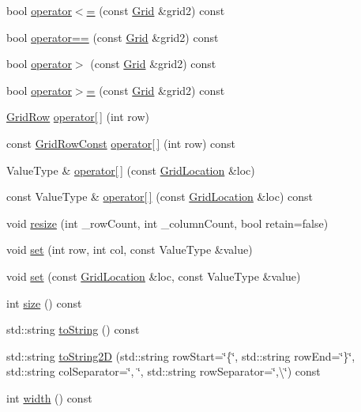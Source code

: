 \begin{DoxyCompactItemize}
$$bool \mbox{\hyperlink{classGrid_adc972513ba66ac1e3e5847abe6e8666c}{operator$<$=}} (const \mbox{\hyperlink{classGrid}{Grid}} \&grid2) const
\item 
bool \mbox{\hyperlink{classGrid_ae321d29c4eab96f54c2f86929a345e2b}{operator==}} (const \mbox{\hyperlink{classGrid}{Grid}} \&grid2) const
\item 
bool \mbox{\hyperlink{classGrid_aa2d6af2768a176d9ba044cf34087d766}{operator$>$}} (const \mbox{\hyperlink{classGrid}{Grid}} \&grid2) const
\item 
bool \mbox{\hyperlink{classGrid_a21431c500035c200656a8d67e96531c7}{operator$>$=}} (const \mbox{\hyperlink{classGrid}{Grid}} \&grid2) const
\item 
\mbox{\hyperlink{classGrid_1_1GridRow}{Grid\+Row}} \mbox{\hyperlink{classGrid_aa62a62fb923c387dbec19d9559fea429}{operator\mbox{[}$\,$\mbox{]}}} (int row)
\item 
const \mbox{\hyperlink{classGrid_1_1GridRowConst}{Grid\+Row\+Const}} \mbox{\hyperlink{classGrid_a8b881f7fb1e524d4cf2766bde140eeb1}{operator\mbox{[}$\,$\mbox{]}}} (int row) const
\item 
Value\+Type \& \mbox{\hyperlink{classGrid_afcc1243cd81603e13b8f223f0ceabe96}{operator\mbox{[}$\,$\mbox{]}}} (const \mbox{\hyperlink{structGridLocation}{Grid\+Location}} \&loc)
\item 
const Value\+Type \& \mbox{\hyperlink{classGrid_a914315640e381831ab30403063205359}{operator\mbox{[}$\,$\mbox{]}}} (const \mbox{\hyperlink{structGridLocation}{Grid\+Location}} \&loc) const
\item 
void \mbox{\hyperlink{classGrid_aa8036710a8d91046066eacbb8548b6fc}{resize}} (int \+\_\+row\+Count, int \+\_\+column\+Count, bool retain=false)
\item 
void \mbox{\hyperlink{classGrid_a6f5cee26d171f36d280a15c51332efc2}{set}} (int row, int col, const Value\+Type \&value)
\item 
void \mbox{\hyperlink{classGrid_a02a61287a9aee6a1ff7e8a8325ce094d}{set}} (const \mbox{\hyperlink{structGridLocation}{Grid\+Location}} \&loc, const Value\+Type \&value)
\item 
int \mbox{\hyperlink{classGrid_af9593d4a5ff4274efaf429cb4f9e57cc}{size}} () const
\item 
std\+::string \mbox{\hyperlink{classGrid_a1fe5121d6528fdea3f243321b3fa3a49}{to\+String}} () const
\item 
std\+::string \mbox{\hyperlink{classGrid_a8e636ad8b56218c7e0162d6c1bd78b39}{to\+String2D}} (std\+::string row\+Start=\char`\"{}\{\char`\"{}, std\+::string row\+End=\char`\"{}\}\char`\"{}, std\+::string col\+Separator=\char`\"{}, \char`\"{}, std\+::string row\+Separator=\char`\"{},\textbackslash{}\char`\"{}) const
\item 
int \mbox{\hyperlink{classGrid_ad72663daf610f2a0833a2fc3d78e4fdf}{width}} () const
\end{DoxyCompactItemize}


